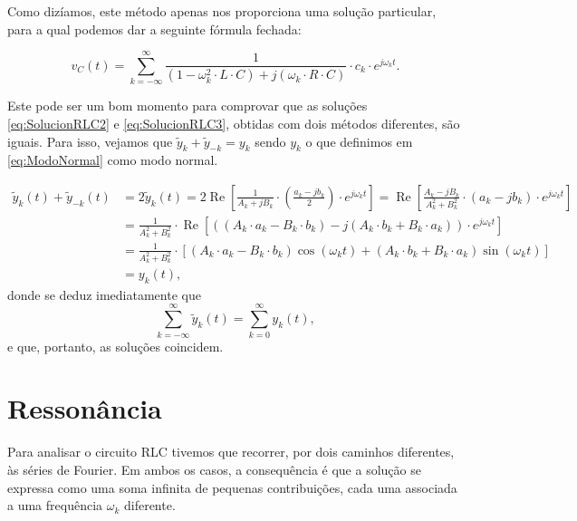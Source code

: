 Como dizíamos, este método apenas nos proporciona uma solução particular, para a qual podemos dar a seguinte fórmula fechada:
\begin{mybox} \vspace{-4mm}
  \begin{equation}
    \label{eq:SolucionRLC3}
    v_C(t) = \sum_{k=-\infty}^\infty \frac{1}{(1-\omega_k^2 \cdot L\cdot C) + j(\omega_k \cdot R\cdot C)}\cdot c_k \cdot e^{j\omega_k t}.
  \end{equation}
\end{mybox}

Este pode ser um bom momento para comprovar que as soluções \eqref{eq:SolucionRLC2} e \eqref{eq:SolucionRLC3}, obtidas com dois métodos diferentes, são iguais. Para isso, vejamos que $ \tilde{y}_k + \tilde{y}_{-k} = y_k$ sendo $y_k$ o que definimos em \eqref{eq:ModoNormal} como modo normal.

\begin{align*}
   \tilde{y}_k(t) + \tilde{y}_{-k}(t) 
   &= 2 \tilde{y}_k(t) = 2\operatorname{Re}\left[ \frac{1}{A_k + jB_k}\cdot  \left(\frac{a_k-jb_k}{2}\right)\cdot e^{j\omega_k t} \right] = \operatorname{Re}\left[ \frac{A_k-jB_k}{A_k^2 + B_k^2}\cdot \left(a_k-jb_k\right)\cdot e^{j\omega_k t} \right] \\
   &=  \frac{1}{A_k^2 + B_k^2} \cdot \operatorname{Re}\left[ ((A_k\cdot a_k - B_k\cdot b_k) - j(A_k\cdot b_k + B_k\cdot a_k)) \cdot e^{j\omega_k t} \right] \\
   &= \frac{1}{A_k^2 + B_k^2}\cdot \left[ (A_k\cdot a_k - B_k\cdot b_k)\cos(\omega_k t) + (A_k\cdot b_k + B_k\cdot a_k)\sin(\omega_k t) \right]\\
   &= y_k(t),
\end{align*}
donde se deduz imediatamente que
\[
\sum_{k=-\infty}^\infty \tilde{y}_k(t) = \sum_{k=0}^\infty y_k (t),
\]
e que, portanto, as soluções coincidem.















\section{Ressonância}
Para analisar o circuito RLC tivemos que recorrer, por dois caminhos diferentes, às séries de Fourier. Em ambos os casos, a consequência é que a solução se expressa como uma soma infinita de pequenas contribuições, cada uma associada a uma frequência $\omega_k$ diferente.

